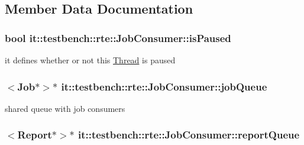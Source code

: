 \subsection{Member Data Documentation}
\hypertarget{classit_1_1testbench_1_1rte_1_1JobConsumer_a2be8d6e14890fc6431f5e24e5d8066c6}{
\subsubsection[{is\-Paused}]{\setlength{\rightskip}{0pt plus 5cm}bool it\-::testbench\-::rte\-::\-Job\-Consumer\-::is\-Paused\hspace{0.3cm}{\ttfamily [private]}}}\label{dc/d6e/classit_1_1testbench_1_1rte_1_1JobConsumer_a2be8d6e14890fc6431f5e24e5d8066c6}
it defines whether or not this \hyperlink{classit_1_1testbench_1_1rte_1_1Thread}{Thread} is paused \hypertarget{classit_1_1testbench_1_1rte_1_1JobConsumer_a31303a86a0747233efbb960977dec9e3}{
\subsubsection[{job\-Queue}]{$<${\bf Job}$\ast$$>$$\ast$ it\-::testbench\-::rte\-::\-Job\-Consumer\-::job\-Queue\hspace{0.3cm}{\ttfamily [private]}}}\label{dc/d6e/classit_1_1testbench_1_1rte_1_1JobConsumer_a31303a86a0747233efbb960977dec9e3}
shared queue with job consumers \hypertarget{classit_1_1testbench_1_1rte_1_1JobConsumer_a06fecb4c1c61ddff302a3bc6a44cad6a}{
\subsubsection[{report\-Queue}]{$<${\bf Report}$\ast$$>$$\ast$ it\-::testbench\-::rte\-::\-Job\-Consumer\-::report\-Queue\hspace{0.3cm}{\ttfamily [private]}}}\label{dc/d6e/classit_1_1testbench_1_1rte_1_1JobConsumer_a06fecb4c1c61ddff302a3bc6a44cad6a}
